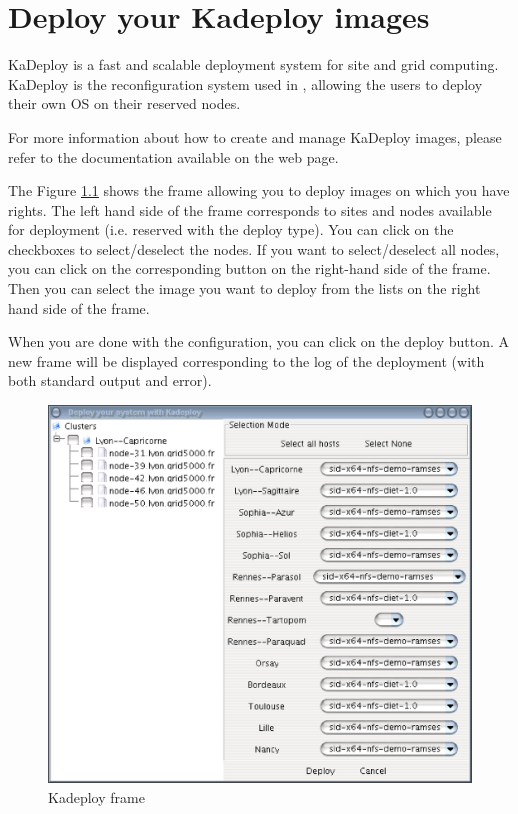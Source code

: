 \chapter{Deploy your Kadeploy images}
KaDeploy is a fast and scalable deployment system for site and grid
computing. KaDeploy is the reconfiguration system used in \gfk, allowing
the users to deploy their own OS on their reserved nodes.

For more information about how to create and manage KaDeploy images, please
refer to the documentation available on the \gfk web page.

The Figure \ref{fig:GRUDU_kadeploy} shows the frame allowing you to deploy
images on which you have rights. The left hand side of the frame corresponds to
sites and nodes available for deployment (i.e. reserved with the deploy type).
 You can click on the checkboxes to select/deselect the nodes. If you want to 
select/deselect all nodes, you can click on the corresponding button on the 
right-hand side of the frame. Then you can select the image you want to deploy
from the lists on the right hand side of the frame.

When you are done with the configuration, you can click on the deploy
button. A new frame will be displayed corresponding to the log of the deployment
(with both standard output and error).

  \begin{figure}[H]
	\centering
	\includegraphics[width=0.5\linewidth]{figures/GRUDU_kadeploy.eps}
	\caption{Kadeploy frame}
	\label{fig:GRUDU_kadeploy}
  \end{figure}

